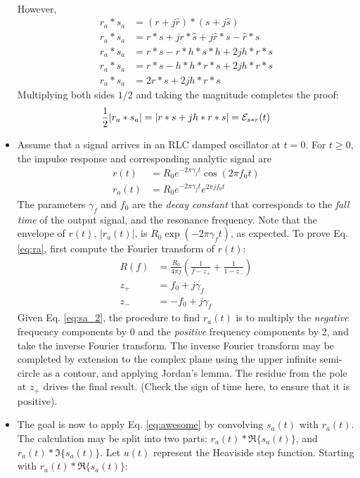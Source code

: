 \documentclass[amsmath,amssymb,aps,prd,10pt,twocolumn,showkeys]{revtex4}
\begin{document}
\begin{itemize}
\begin{align}
\end{align}
However,
\begin{align}
r_a * s_a &= (r + j \hat{r}) * (s + j \hat{s}) \\
r_a * s_a &= r * s + j r * \hat{s} + j \hat{r} * s - \hat{r} * \hat{s} \\
r_a * s_a &= r * s - r * h * s * h + 2 j h * r * s \\
r_a * s_a &= r * s - h * h * r * s + 2 j h * r * s \\
r_a * s_a &= 2 r * s + 2 j h * r * s
\end{align}
Multiplying both sides $1/2$ and taking the magnitude completes the proof:
\begin{equation}
\frac{1}{2} |r_a * s_a| = |r * s + j h * r * s| = \mathcal{E}_{s * r}(t) \\
\end{equation}
\item Assume that a signal arrives in an RLC damped oscillator at $t=0$.  For $t\geq 0$, the impulse response and corresponding analytic signal are
\begin{align}
r(t) &= R_0 e^{-2 \pi \gamma_f t} \cos(2\pi f_0 t) \label{eq:r} \\
r_a(t) &= R_0 e^{-2 \pi \gamma_f t} e^{2\pi j f_0 t} \label{eq:ra}
\end{align}
The parameters $\gamma_f$ and $f_0$ are the \textit{decay constant} that corresponds to the \textit{fall time} of the output signal, and the resonance frequency.  Note that the envelope of $r(t)$, $|r_a(t)|$, is $R_0 \exp(-2 \pi \gamma_f t)$, as expected.  To prove Eq. \ref{eq:ra}, first compute the Fourier transform of $r(t)$:
\begin{align}
R(f) &= \frac{R_0}{4\pi j} \left( \frac{1}{f - z_{+}} + \frac{1}{1- z_{-}} \right) \\
z_{+} &= f_0 + j \gamma_f \\
z_{-} &= -f_0 + j \gamma_f
\end{align}
Given Eq. \ref{eq:sa_2}, the procedure to find $r_a(t)$ is to multiply the \textit{negative} frequency components by 0 and the \textit{positive} frequency components by 2, and take the inverse Fourier transform.  The inverse Fourier transform may be completed by extension to the complex plane using the upper infinite semi-circle as a contour, and applying Jordan's lemma.  The residue from the pole at $z_{+}$ drives the final result. (Check the sign of time here, to ensure that it is positive).
\item The goal is now to apply Eq. \ref{eq:awesome} by convolving $s_a(t)$ with $r_a(t)$.  The calculation may be split into two parts: $r_a(t) * \Re\lbrace s_a(t) \rbrace$, and $r_a(t) * \Im\lbrace s_a(t) \rbrace$.  Let $u(t)$ represent the Heaviside step function.  Starting with $r_a(t) * \Re\lbrace s_a(t) \rbrace$:

\end{itemize}
\end{document}
